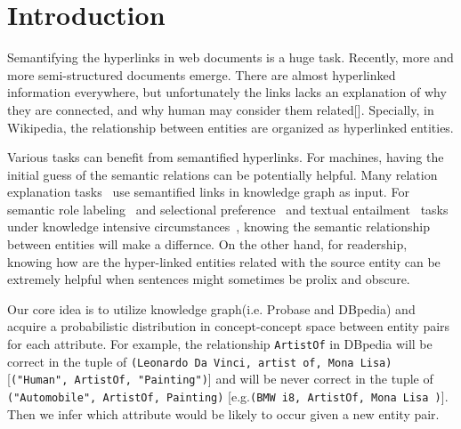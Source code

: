 \section{Introduction}


Semantifying the hyperlinks in web documents is a huge task. 
Recently, more and more semi-structured documents emerge. 
There are almost hyperlinked information everywhere, but unfortunately the links lacks an explanation of why they are connected, and why human may consider them related[]. 
Specially, in Wikipedia, the relationship between entities are organized as hyperlinked entities.

Various tasks can benefit from semantified hyperlinks.
For machines, having the initial guess of the semantic relations can be potentially helpful. 
Many relation explanation tasks~\cite{fang2011rex,nakashole2012discovering,voskarideslearning} use semantified links in knowledge graph as input.
For semantic role labeling~\cite{palmer2010semantic} and selectional preference~\cite{pantel2007isp} and textual entailment~\cite{androutsopoulos2010survey} tasks under knowledge intensive circumstances~\cite{yao2012unsupervised,exner2011using}, knowing the semantic relationship between entities will make a differnce.
On the other hand, for readership, knowing how are the hyper-linked entities related with the source entity can be extremely helpful when sentences might sometimes be prolix and obscure.


Our core idea is to utilize knowledge graph(i.e. \ac{Probase} and \ac{DBpedia}) and acquire a probabilistic distribution in concept-concept space between entity pairs for each attribute. 
For example, the relationship {\tt ArtistOf} in \ac{DBpedia} will be correct in the tuple of {\tt(Leonardo Da Vinci, artist of, Mona Lisa)} [{\tt("Human", ArtistOf, "Painting")}] and will be never correct in the tuple of {\tt ("Automobile", ArtistOf, Painting)} [e.g.{\tt(BMW i8, ArtistOf, Mona Lisa )}]. 
Then we infer which attribute would be likely to occur given a new entity pair. 

